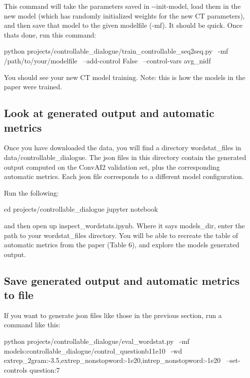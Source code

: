 This command will take the parameters saved in {\ttfamily -\/-\/init-\/model}, load them in the new model (which has randomly initialized weights for the new CT parameters), and then save that model to the given modelfile ({\ttfamily -\/mf}). It should be quick. Once that\textquotesingle{}s done, run this command\+: \begin{DoxyVerb}python projects/controllable_dialogue/train_controllable_seq2seq.py \
-mf /path/to/your/modelfile \
--add-control False \
--control-vars avg_nidf
\end{DoxyVerb}


You should see your new CT model training. Note\+: this is how the models in the paper were trained.

\subsection*{Look at generated output and automatic metrics}

Once you have downloaded the data, you will find a directory {\ttfamily wordstat\+\_\+files} in {\ttfamily data/controllable\+\_\+dialogue}. The json files in this directory contain the generated output computed on the Conv\+A\+I2 validation set, plus the corresponding automatic metrics. Each json file corresponds to a different model configuration.

Run the following\+: \begin{DoxyVerb}cd projects/controllable_dialogue
jupyter notebook
\end{DoxyVerb}


and then open up {\ttfamily inspect\+\_\+wordstats.\+ipynb}. Where it says {\ttfamily models\+\_\+dir}, enter the path to your {\ttfamily wordstat\+\_\+files} directory. You will be able to recreate the table of automatic metrics from the paper (Table 6), and explore the models\textquotesingle{} generated output.

\subsection*{Save generated output and automatic metrics to file}

If you want to generate json files like those in the previous section, run a command like this\+: \begin{DoxyVerb}python projects/controllable_dialogue/eval_wordstat.py \
-mf models:controllable_dialogue/control_questionb11e10 \
-wd extrep_2gram:-3.5,extrep_nonstopword:-1e20,intrep_nonstopword:-1e20 \
--set-controls question:7
\end{DoxyVerb}


